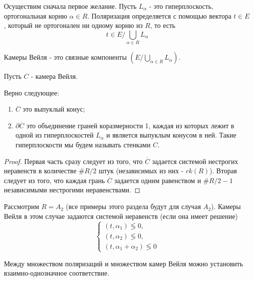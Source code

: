 \documentclass[a4article]{article}
\begin{document}
Осуществим сначала первое желание. Пусть $L_{\alpha}$ - это гиперплоскость, ортогональная корню $\alpha \in R$. Поляризация определяется с помощью вектора $t \in E$, который не ортогонален ни одному корню из $R$, то есть
\begin{equation}
    t \in E / \bigcup_{\alpha \in R} L_{\alpha}
\end{equation}
\begin{definition}
    Камеры Вейля - это связные компоненты $(E / \bigcup_{\alpha \in R} L_{\alpha})$. 
\end{definition}
Пусть $C$ -  камера Вейля.
\begin{lemma}
Верно следующее:
    \begin{enumerate}
        \item $\overline{C}$ это выпуклый конус;
        \item $\partial \overline{C}$ это объединение граней коразмерности 1, каждая из которых лежит в одной из гиперплоскостей $L_{\alpha}$ и является выпуклым конусом в ней. Такие гиперплоскости мы будем называть стенками $C$.
    \end{enumerate}
\end{lemma}
\begin{proof}
    Первая часть сразу следует из того, что $\overline{C}$ задается системой нестрогих неравенств в количестве $\#R/2$ штук (независимых из них - $rk(R)$). Вторая следует из того, что каждая грань $\overline{C}$ задается одним равенством и $\#R/2-1$ независимыми нестрогими неравенствами.
\end{proof}
\begin{example}
    Рассмотрим $R=A_2$ (все примеры этого раздела будут для случая $A_2$). Камеры Вейля в этом случае задаются системой неравенств (если она имеет решение)
    \begin{equation}
        \begin{cases}
            (t, \alpha_1) \lessgtr 0,\\
            (t, \alpha_2) \lessgtr 0,\\
            (t, \alpha_1+\alpha_2) \lessgtr 0
        \end{cases}
    \end{equation}
\end{example}
\begin{lemma}
    Между множеством поляризаций и множеством камер Вейля можно установить взаимно-однозначное соответствие.
\end{lemma}
\end{document}
